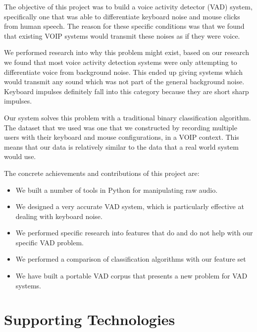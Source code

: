 \documentclass[ %
                    author={Sam Phippen},
                supervisor={Dr. Rafal Bogacz},
                     title={Real time voice activity detectors in noisy personal computing environments},
                  subtitle={},
                    degree={MEng},
                      year={2012} ]{thesis}
\begin{document}
\vspace{1cm}

The objective of this project was to build a voice activity detector (VAD)
system, specifically one that was able to differentiate keyboard noise and
mouse clicks from human speech. The reason for these specific conditions was
that we found that existing VOIP systems would transmit these noises as if they
were voice.

We performed research into why this problem might exist, based on our research
we found that most voice activity detection systems were only attempting to
differentiate voice from background noise. This ended up giving systems which
would transmit any sound which was not part of the general background noise.
Keyboard impulses definitely fall into this category because they are short
sharp impulses.

Our system solves this problem with a traditional binary classification
algorithm. The dataset that we used was one that we constructed by recording
multiple users with their keyboard and mouse configurations, in a VOIP context.
This means that our data is relatively similar to the data that a real world
system would use.

The concrete achievements and contributions of this project are:

\begin{itemize}

    \item We built a number of tools in Python for manipulating raw audio.

    \item We designed a very accurate VAD system, which is particularly
        effective at dealing with keyboard noise.

    \item We performed specific research into features that do and do not help
        with our specific VAD problem.

    \item We performed a comparison of classification algorithms with our
        feature set

    \item We have built a portable VAD corpus that presents a new problem for
        VAD systems.

\end{itemize}



\chapter*{Supporting Technologies}
\end{document}
